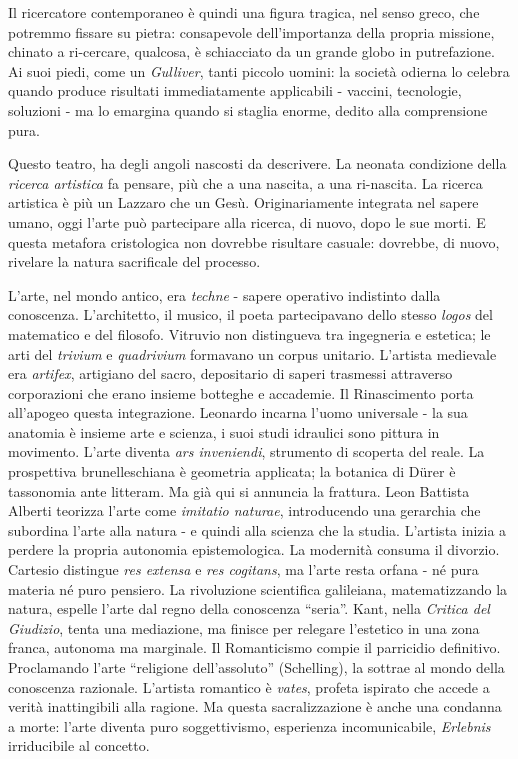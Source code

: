 Il ricercatore contemporaneo è quindi una figura tragica, nel senso greco, che
potremmo fissare su pietra: consapevole dell'importanza della propria missione,
chinato a ri-cercare, qualcosa, è schiacciato da un grande globo in putrefazione.
Ai suoi piedi, come un \emph{Gulliver}, tanti piccolo uomini: la società odierna
lo celebra quando produce risultati immediatamente applicabili - vaccini,
tecnologie, soluzioni - ma lo emargina quando si staglia enorme, dedito alla
comprensione pura.

Questo teatro, ha degli angoli nascosti da descrivere. La neonata condizione
della \emph{ricerca artistica} fa pensare, più che a una nascita, a una
ri-nascita. La ricerca artistica è più un Lazzaro che un Gesù. Originariamente
integrata nel sapere umano, oggi l’arte può partecipare alla ricerca, di nuovo,
dopo le sue morti. E questa metafora cristologica non dovrebbe risultare casuale:
dovrebbe, di nuovo, rivelare la natura sacrificale del processo.

L'arte, nel mondo antico, era \emph{techne} - sapere operativo indistinto dalla
conoscenza. L'architetto, il musico, il poeta partecipavano dello stesso
\emph{logos} del matematico e del filosofo. Vitruvio non distingueva tra
ingegneria e estetica; le arti del \emph{trivium} e \emph{quadrivium} formavano
un corpus unitario. L'artista medievale era \emph{artifex}, artigiano del sacro,
depositario di saperi trasmessi attraverso corporazioni che erano insieme
botteghe e accademie. Il Rinascimento porta all'apogeo questa integrazione.
Leonardo incarna l'uomo universale - la sua anatomia è insieme arte e scienza,
i suoi studi idraulici sono pittura in movimento. L'arte diventa \emph{ars
inveniendi}, strumento di scoperta del reale. La prospettiva brunelleschiana è
geometria applicata; la botanica di Dürer è tassonomia ante litteram. Ma già qui
si annuncia la frattura. Leon Battista Alberti teorizza l'arte come
\emph{imitatio naturae}, introducendo una gerarchia che subordina l'arte alla
natura - e quindi alla scienza che la studia. L'artista inizia a perdere la
propria autonomia epistemologica. La modernità consuma il divorzio. Cartesio
distingue \emph{res extensa} e \emph{res cogitans}, ma l'arte resta orfana - né
pura materia né puro pensiero. La rivoluzione scientifica galileiana,
matematizzando la natura, espelle l'arte dal regno della conoscenza “seria”.
Kant, nella \emph{Critica del Giudizio}, tenta una mediazione, ma finisce per
relegare l'estetico in una zona franca, autonoma ma marginale. Il Romanticismo
compie il parricidio definitivo. Proclamando l'arte “religione dell'assoluto”
(Schelling), la sottrae al mondo della conoscenza razionale. L'artista romantico
è \emph{vates}, profeta ispirato che accede a verità inattingibili alla ragione.
Ma questa sacralizzazione è anche una condanna a morte: l'arte diventa puro
soggettivismo, esperienza incomunicabile, \emph{Erlebnis} irriducibile al
concetto.

